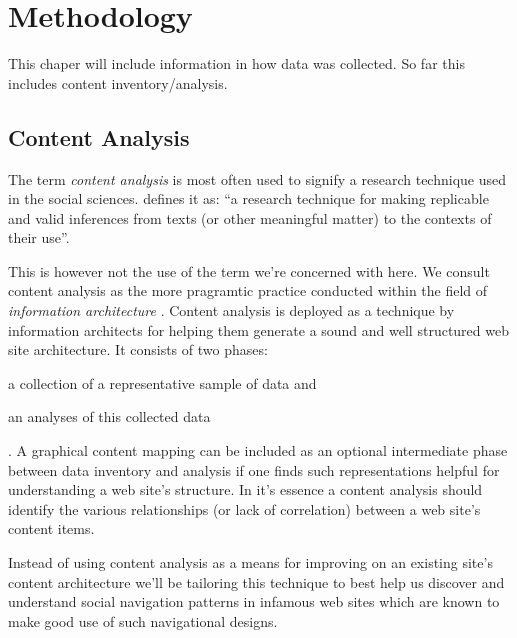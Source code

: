 \chapter{Methodology}
\label{chapter:methodology}

This chaper will include information in how data was collected. So far this
includes content inventory/analysis.

\section{Content Analysis}

The term \emph{content analysis} is most often used to signify a research
technique used in the social sciences.
\citet[p.~18]{krippendorff03} defines it as:
``a research technique for making replicable and valid
inferences from texts (or other meaningful matter) to the contexts of their
use''.

This is however not the use of the term we're concerned with here. We consult
content analysis as the more pragramtic practice conducted within the field of
\emph{information architecture}%
.
Content analysis is deployed as a technique by information architects for
helping them generate a sound and well structured web site architecture.
It consists of two phases:
\begin{inparaenum}[(i)]
  \item a collection of a representative sample of data and
  \item an analyses of this collected data
\end{inparaenum}
\citep[pp.~241--243]{morville06}.
A graphical content mapping can be included as an optional
intermediate phase between data inventory and analysis if one finds such
representations helpful for understanding a web site's structure.
In it's essence a content analysis should identify the various
relationships (or lack of correlation) between a web site's content items.

Instead of using content analysis as a means for improving on an existing
site's content architecture we'll be tailoring this technique to best help us
discover and understand social navigation patterns in infamous web sites which
are known to make good use of such navigational designs.
